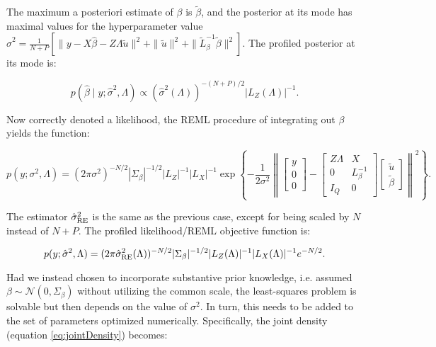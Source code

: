 \documentclass[article,shortnames]{jss}
\begin{document}
\noindent The maximum a posteriori estimate of $\beta$ is
$\tilde\beta$, and the posterior at its mode has maximal values for
the hyperparameter value $\hat{\sigma}^2 =
\frac{1}{N+P}\left[\|y - X\hat{\beta} - Z\Lambda\tilde{u}\|^2 +
  \|\tilde{u}\|^2 + \|\tilde L_{\beta}^{-1}
  \tilde\beta\|^2\right]$. The profiled posterior at its mode is:

\begin{equation*}
  p(\hat{\beta} \mid y; \hat{\sigma}^2, \Lambda) \propto
  (\hat{\sigma}^2(\Lambda))^{-(N+P)/2} |L_Z(\Lambda)|^{-1}.
\end{equation*}

Now correctly denoted a likelihood, the REML procedure of integrating
out $\beta$ yields the function:

\begin{equation*}
  p(y;\sigma^2, \Lambda) = (2\pi\sigma^2)^{-N/2}|\Sigma_\beta|^{-1/2}
  |L_Z|^{-1} |L_X|^{-1}   \exp\left\{-\frac{1}{2\sigma^2} \left\|\begin{bmatrix}y \\ 0 \\ 0\end{bmatrix} -
      \begin{bmatrix} Z \Lambda & X \\ 0 & L_\beta^{-1} \\ I_Q & 0 \end{bmatrix}
      \begin{bmatrix} \tilde{u} \\ \tilde\beta \end{bmatrix}\right\|^2\right\}.
\end{equation*}

The estimator $\hat{\sigma}^2_{\rm RE}$ is the same as the previous case, except for being scaled by
$N$ instead of $N+P$. The profiled likelihood/REML objective function is:

\begin{equation*}
  p(y; \hat{\sigma}^2, \Lambda) =
  (2\pi\hat{\sigma}^2_{\rm RE}(\Lambda))^{-N/2}|\Sigma_\beta|^{-1/2} |L_Z(\Lambda)|^{-1}|L_X(\Lambda)|^{-1}
  e^{-N/2}.
\end{equation*}

Had we instead chosen to incorporate substantive prior knowledge,
i.e. assumed $\beta \sim \mathcal{N}(0, \Sigma_\beta)$ without utilizing
the common scale, the least-squares problem is solvable but then
depends on the value of $\sigma^2$. In turn, this needs to be added to
the set of parameters optimized numerically. Specifically, the joint
density (equation \ref{eq:jointDensity}) becomes:
\end{document}
